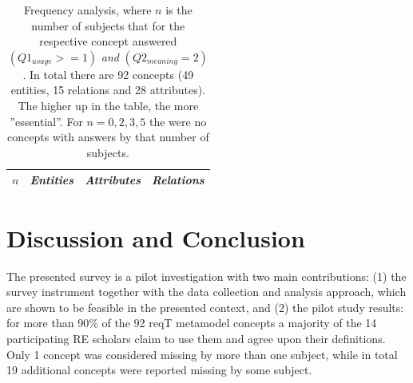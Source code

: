 \documentclass[a4paper]{llncs}
\begin{document}
\vspace{-3.6em}
\begingroup
\setlength{\tabcolsep}{4pt} %
\renewcommand{\arraystretch}{1.35} %
\begin{table}
\begin{center}
\fontsize{7}{8}\selectfont
\caption{Frequency analysis, where $n$ is the number of subjects that for the respective concept answered $(Q1_{usage}>= 1)$ \textit{and} $(Q2_{meaning} = 2)$. In total there are 92 concepts (49 entities, 15 relations and 28 attributes). The higher up in the table, the more ''essential''. For $n = 0, 2, 3, 5$ the were no concepts with answers by that number of subjects.}
\label{table:frequency}
\begin{tabular}{l | p{} | p{} | p{}}
\textit{$n$} & \textit{Entities} & \textit{Attributes} & \textit{Relations} \\ \hline

\end{tabular}
\end{center}

\end{table}
\endgroup





\section{Discussion and Conclusion}\label{section:discussion}

The presented survey is a pilot investigation with two main contributions: (1) the survey instrument together with the data collection and analysis approach, which are shown to be feasible in the presented context, and (2) the pilot study results: for more than 90\% of the 92 reqT metamodel concepts a majority of the 14 participating RE scholars claim to use them and agree upon their definitions. Only 1 concept was considered missing by more than one subject, while in total 19 additional concepts were reported missing by some subject. 
\end{document}
